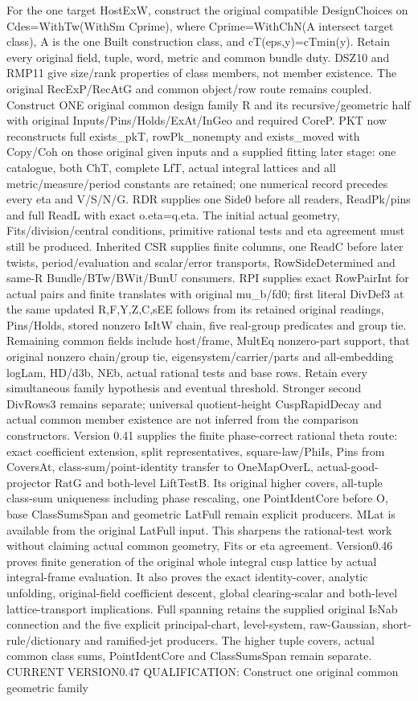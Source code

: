 For the one target HostExW, construct the original compatible DesignChoices on Cdes=WithTw(WithSm Cprime), where Cprime=WithChN(A intersect target class), A is the one Built construction class, and cT(eps,y)=cTmin(y). Retain every original field, tuple, word, metric and common bundle duty. DSZ10 and RMP11 give size/rank properties of class members, not member existence. The original RecExP/RecAtG and common object/row route remains coupled. Construct ONE original common design family R and its recursive/geometric half with original Inputs/Pins/Holds/ExAt/InGeo and required CoreP. PKT now reconstructs full exists\_\allowbreak pkT, rowPk\_\allowbreak nonempty and exists\_\allowbreak moved with Copy/Coh on those original given inputs and a supplied fitting later stage: one catalogue, both ChT, complete LfT, actual integral lattices and all metric/measure/period constants are retained; one numerical record precedes every eta and V/S/N/G. RDR supplies one Side0 before all readers, ReadPk/pins and full ReadL with exact o.eta=q.eta. The initial actual geometry, Fits/division/central conditions, primitive rational tests and eta agreement must still be produced. Inherited CSR supplies finite columns, one ReadC before later twists, period/evaluation and scalar/error transports, RowSideDetermined and same-R Bundle/BTw/BWit/BunU consumers. RPI supplies exact RowPairInt for actual pairs and finite translates with original mu\_\allowbreak b/fd0; first literal DivDef3 at the same updated R,F,Y,Z,C,sEE follows from its retained original readings, Pins/Holds, stored nonzero IsItW chain, five real-group predicates and group tie. Remaining common fields include host/frame, MultEq nonzero-part support, that original nonzero chain/group tie, eigensystem/carrier/parts and all-embedding logLam, HD/d3b, NEb, actual rational tests and base rows. Retain every simultaneous family hypothesis and eventual threshold. Stronger second DivRows3 remains separate; universal quotient-height CuspRapidDecay and actual common member existence are not inferred from the comparison constructors. Version 0.41 supplies the finite phase-correct rational theta route: exact coefficient extension, split representatives, square-law/PhiIs, Pins from CoversAt, class-sum/point-identity transfer to OneMapOverL, actual-good-projector RatG and both-level LiftTestB. Its original higher covers, all-tuple class-sum uniqueness including phase rescaling, one PointIdentCore before O, base ClassSumsSpan and geometric LatFull remain explicit producers. MLat is available from the original LatFull input. This sharpens the rational-test work without claiming actual common geometry, Fits or eta agreement. Version0.46 proves finite generation of the original whole integral cusp lattice by actual integral-frame evaluation. It also proves the exact identity-cover, analytic unfolding, original-field coefficient descent, global clearing-scalar and both-level lattice-transport implications. Full spanning retains the supplied original IsNab connection and the five explicit principal-chart, level-system, raw-Gaussian, short-rule/dictionary and ramified-jet producers. The higher tuple covers, actual common class sums, PointIdentCore and ClassSumsSpan remain separate. CURRENT VERSION0.47 QUALIFICATION: Construct one original common geometric family 